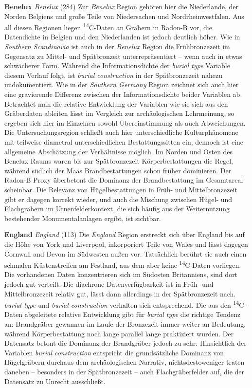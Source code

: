 \documentclass[openany,twoside,twocolumn]{book}
\begin{document}
\textbf{Benelux} \emph{Benelux} (284) \newline 
Zur \emph{Benelux} Region gehören hier die Niederlande, der Norden Belgiens und große Teile von Niedersachen und Nordrheinwestfalen. Aus all diesen Regionen liegen \textsuperscript{14}C-Daten an Gräbern in Radon-B vor, die Datendichte in Belgien und den Niederlanden ist jedoch deutlich höher. Wie in \emph{Southern Scandinavia} ist auch in der \emph{Benelux} Region die Frühbronzezeit im Gegensatz zu Mittel- und Spätbronzeit unterrepräsentiert -- wenn auch in etwas schwächerer Form. Während die Informationsdichte der \emph{burial type} Variable diesem Verlauf folgt, ist \emph{burial construction} in der Spätbronzezeit nahezu undokumentiert. Wie in der \emph{Southern Germany} Region zeichnet sich auch hier eine gravierende Differenz zwischen der Informationsdichte beider Variablen ab. Betrachtet man die relative Entwicklung der Variablen wie sie sich aus den Gräberdaten ableiten lässt im Vergleich zur archäologischen Lehrmeinung, so ergeben sich hier im Einzelnen sowohl Übereinstimmung als auch Abweichungen. Die Untersuchungsregion schließt auch hier unterschiedliche Kulturphänomene mit teilweise diametral unterschiedlichen Bestattungssitten ein, dennoch ist eine allgemeine Abschätzung der Verhältnisse möglich. Im Norden und Osten des Benelux Raums waren bis zur Spätbronzezeit Körperbestattungen die Regel, während südlich der Maas Brandbestattungen schon früher dominieren. Der Radon-B Proxy überbetont die Dominanz der Brandbestattung im Gesamtareal scheinbar. Die Relevanz von Hügelbestattungen in Früh- und Mittelbronzezeit gibt er dagegen korrekt wieder, und auch die Mischung zwischen Hügel- und Flachgräbern im Urnenfelderkontext, die sich häufig aus der Weiternutzung bestehender Monumentalanlagen ergibt, ist sichtbar.

\textbf{England} \emph{England} (113) \newline 
Die \emph{England} Region erstreckt sich über England bis auf die Höhe von York und Liverpool, inkorporiert Teile von Wales und lässt dagegen Cornwall and Devon im Südwesten außen vor. Tatsächlich berührt sie auch einen schmalen Küstenstreifen am Festland, aus dem aber keine \textsuperscript{14}C-Daten vorliegen. Die vorhandenen Daten konzentrieren sich im Südosten Britanniens, sind dort jedoch gut verteilt. Die diachrone Datenverfügbarkeit ist in Früh- und Mittelbronzezeit relativ gut, lässt dann allerdings in der Spätbronzezeit nach. \emph{burial type} und \emph{burial construction} verhalten sich entsprechend. Die aus den \textsuperscript{14}C-Daten abgeleitete relative Entwicklung gibt für \emph{burial type} die richtige Tendenz an: Brandgräber gewannen im Laufe der Bronzezeit immer weiter an Bedeutung, während Körperbestattung noch lange parallel lange praktiziert wurden. Der Datensatz betont die Dominanz der Brandgräber jedoch zu sehr. Hinsichtlich der Variablen \emph{burial construction} entspricht die grundsätzliche Dominanz von Hügelgräbern durchaus dem archäologischen Narrativ, nichtsdestoweniger traten daneben -- besonders in der Spätbronzezeit -- auch Flachgräberfelder auf, die der Datensatz zu Unrecht ausschließt.
\end{document}
